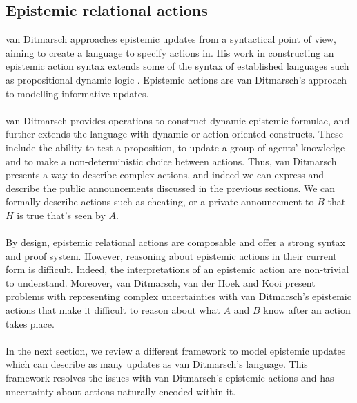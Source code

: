 \subsection{Epistemic relational actions} \label{epi_acts}
van Ditmarsch approaches epistemic updates from a syntactical point of view,
aiming to create a language to specify actions in.
His work in constructing an epistemic action syntax extends some of the
syntax of established languages such as propositional dynamic
logic \cite{ditmarsch99knowledge,ditmarsch2002dga}.
Epistemic actions are van Ditmarsch's approach to modelling informative updates.\\
\\
van Ditmarsch provides operations to construct dynamic epistemic formulae, and
further extends the language with dynamic or action-oriented constructs.
These include the ability to test a proposition, to update a group of agents'
knowledge and to make a non-deterministic choice between actions.
Thus, van Ditmarsch presents a way to describe complex actions, and indeed we can
express and describe the public announcements discussed in the previous sections.
We can formally describe actions such as cheating, or a private
announcement to $B$ that $H$ is true that's seen by $A$.\\
\\
By design, epistemic relational actions are composable and offer a strong syntax and proof system.
However, reasoning about epistemic actions in their current form is difficult.
Indeed, the interpretations of an epistemic action are non-trivial to
understand.
Moreover, van Ditmarsch, van der Hoek and Kooi present problems with
representing complex uncertainties with van Ditmarsch's epistemic actions that make it difficult
to reason about what $A$ and $B$ know after an action takes place.\\
\\
In the next section, we review a different framework to model epistemic updates
which can describe as many updates as van Ditmarsch's language.
This framework resolves the issues with van Ditmarsch's epistemic actions and
has uncertainty about actions naturally encoded within it.
